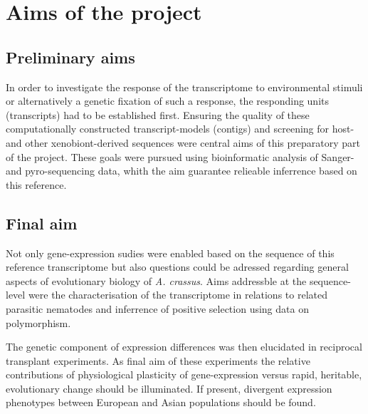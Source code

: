 
\chapter{Aims of the project} %



\section{Preliminary aims}

In order to investigate the response of the transcriptome to
environmental stimuli or alternatively a genetic fixation of such a
response, the responding units (transcripts) had to be established
first. Ensuring the quality of these computationally constructed
transcript-models (contigs) and screening for host- and other
xenobiont-derived sequences were central aims of this preparatory part
of the project. These goals were pursued using bioinformatic analysis
of Sanger- and pyro-sequencing data, whith the aim guarantee relieable
inferrence based on this reference.

\section{Final aim}

Not only gene-expression sudies were enabled based on the sequence of
this reference transcriptome but also questions could be adressed
regarding general aspects of evolutionary biology of
\textit{A. crassus}. Aims addressble at the sequence-level were the
characterisation of the transcriptome in relations to related
parasitic nematodes and inferrence of positive selection using data on
polymorphism.

The genetic component of expression differences was then elucidated in
reciprocal transplant experiments. As final aim of these experiments
the relative contributions of physiological plasticity of
gene-expression versus rapid, heritable, evolutionary change should be
illuminated. If present, divergent expression phenotypes between
European and Asian populations should be found.




     